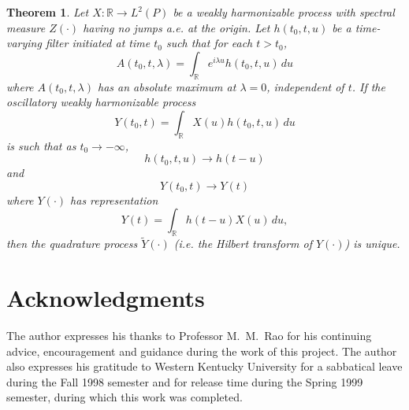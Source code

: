 \documentclass[12pt]{article}
\newtheorem{theorem}{Theorem}[section]
\begin{document}
\begin{theorem}\label{thm:main}
Let $X: \mathbb{R} \to L^2(P)$ be a weakly harmonizable process with spectral measure $Z(\cdot)$ having no jumps a.e. at the origin. Let $h(t_0, t, u)$ be a time-varying filter initiated at time $t_0$ such that for each $t > t_0$,
\begin{equation}
    A(t_0, t, \lambda) = \int_{\mathbb{R}} e^{i\lambda u} h(t_0, t, u) \, du
    \label{eq:theorem_filter}
\end{equation}
where $A(t_0, t, \lambda)$ has an absolute maximum at $\lambda = 0$, independent of $t$. If the oscillatory weakly harmonizable process
\begin{equation}
    Y(t_0, t) = \int_{\mathbb{R}} X(u) h(t_0, t, u) \, du
    \label{eq:theorem_y}
\end{equation}
is such that as $t_0 \to -\infty$,
\begin{equation}
    h(t_0, t, u) \to h(t - u)
    \label{eq:theorem_h_limit}
\end{equation}
and
\begin{equation}
    Y(t_0, t) \to Y(t)
    \label{eq:theorem_y_limit}
\end{equation}
where $Y(\cdot)$ has representation
\begin{equation}
    Y(t) = \int_{\mathbb{R}} h(t - u) X(u) \, du,
    \label{eq:theorem_y_final}
\end{equation}
then the quadrature process $\tilde{Y}(\cdot)$ (i.e. the Hilbert transform of $Y(\cdot)$) is unique.
\end{theorem}

\section*{Acknowledgments}
The author expresses his thanks to Professor M.~M.~Rao for his continuing advice, encouragement and guidance during the work of this project. The author also expresses his gratitude to Western Kentucky University for a sabbatical leave during the Fall 1998 semester and for release time during the Spring 1999 semester, during which this work was completed.
\end{document}
